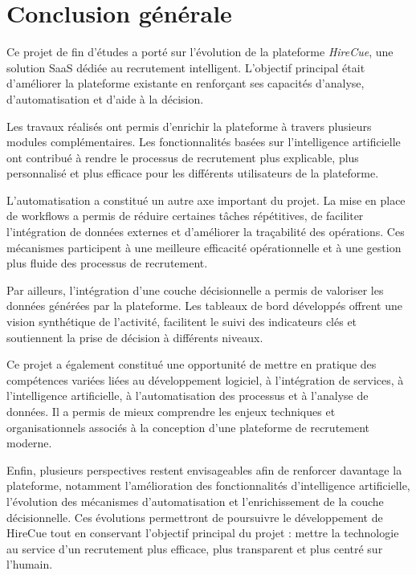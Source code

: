 \cleardoublepage
{}
\chapter*{Conclusion générale}

Ce projet de fin d’études a porté sur l’évolution de la plateforme \textit{HireCue}, une solution SaaS dédiée au recrutement intelligent. L’objectif principal était d’améliorer la plateforme existante en renforçant ses capacités d’analyse, d’automatisation et d’aide à la décision.

Les travaux réalisés ont permis d’enrichir la plateforme à travers plusieurs modules complémentaires. Les fonctionnalités basées sur l’intelligence artificielle ont contribué à rendre le processus de recrutement plus explicable, plus personnalisé et plus efficace pour les différents utilisateurs de la plateforme.

L’automatisation a constitué un autre axe important du projet. La mise en place de workflows a permis de réduire certaines tâches répétitives, de faciliter l’intégration de données externes et d’améliorer la traçabilité des opérations. Ces mécanismes participent à une meilleure efficacité opérationnelle et à une gestion plus fluide des processus de recrutement.

Par ailleurs, l’intégration d’une couche décisionnelle a permis de valoriser les données générées par la plateforme. Les tableaux de bord développés offrent une vision synthétique de l’activité, facilitent le suivi des indicateurs clés et soutiennent la prise de décision à différents niveaux.

Ce projet a également constitué une opportunité de mettre en pratique des compétences variées liées au développement logiciel, à l’intégration de services, à l’intelligence artificielle, à l’automatisation des processus et à l’analyse de données. Il a permis de mieux comprendre les enjeux techniques et organisationnels associés à la conception d’une plateforme de recrutement moderne.

Enfin, plusieurs perspectives restent envisageables afin de renforcer davantage la plateforme, notamment l’amélioration des fonctionnalités d’intelligence artificielle, l’évolution des mécanismes d’automatisation et l’enrichissement de la couche décisionnelle. Ces évolutions permettront de poursuivre le développement de HireCue tout en conservant l’objectif principal du projet : mettre la technologie au service d’un recrutement plus efficace, plus transparent et plus centré sur l’humain.
